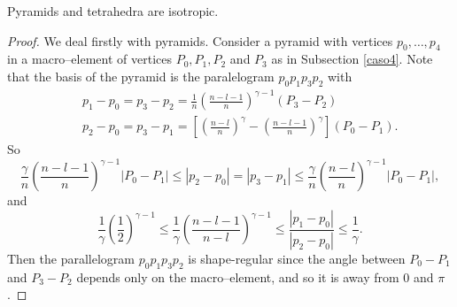 \begin{proposition} Pyramids and tetrahedra are isotropic.
\end{proposition}
\begin{proof} We deal firstly with pyramids. Consider a pyramid with vertices $p_0, \ldots, p_4$ in a macro--element of vertices $P_0,P_1,P_2$ and $P_3$ as in Subsection \ref{caso4}. Note that the basis of the pyramid is the paralelogram $p_0p_1p_3p_2$ with
\begin{eqnarray}\label{once}
&&p_1-p_0=p_3-p_2=\frac1n\left(\frac{n-l-1}n\right)^{\gamma-1}(P_3-P_2)\\\label{doce} &&p_2-p_0=p_3-p_1=\left[\left(\frac{n-l}n\right)^\gamma-\left(\frac{n-l-1}n\right)^\gamma\right](P_0-P_1).
\end{eqnarray}
So 
\[
\frac{\gamma}{n}\left(\frac{n-l-1}n\right)^{\gamma-1}|P_0-P_1|\le |p_2-p_0|=|p_3-p_1|\le \frac{\gamma}{n}\left(\frac{n-l}n\right)^{\gamma-1}|P_0-P_1|,
\]
and 
\[
\frac1\gamma\left(\frac12\right)^{\gamma-1}\le\frac1\gamma\left(\frac{n-l-1}{n-l}\right)^{\gamma-1}\le\frac{|p_1-p_0|}{|p_2-p_0|}\le \frac1\gamma.
\]
Then the parallelogram $p_0p_1p_3p_2$ is shape-regular since the angle between $P_0-P_1$ and $P_3-P_2$ depends only on the macro--element, and so it is away from $0$ and $\pi$. 


\end{proof}
